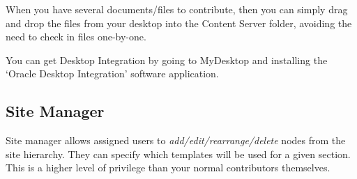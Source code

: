 When you have several documents/files to contribute, then you can
simply drag and drop the files from your desktop into the Content
Server folder, avoiding the need to check in files one-by-one.

You can get Desktop Integration by going to MyDesktop and installing
the `Oracle Desktop Integration' software application.

\subsection{Site Manager}

Site manager allows assigned users to \emph{add/edit/rearrange/delete} nodes
from the site hierarchy.  They can specify which templates will be
used for a given section.  This is a higher level of privilege than
your normal contributors themselves.